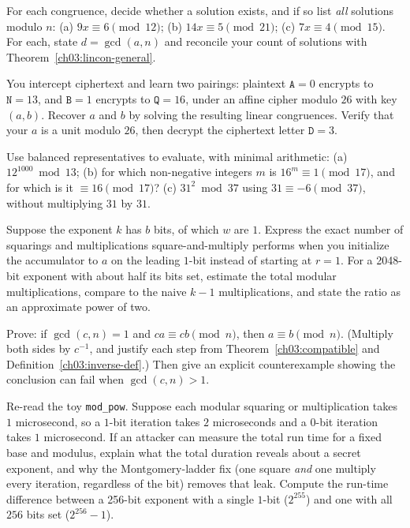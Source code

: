 \begin{exercise}
For each congruence, decide whether a solution exists, and if so list \emph{all} solutions modulo $n$:
(a) $9x \equiv 6 \pmod{12}$;\;
(b) $14x \equiv 5 \pmod{21}$;\;
(c) $7x \equiv 4 \pmod{15}$.
For each, state $d = \gcd(a,n)$ and reconcile your count of solutions with Theorem~\ref{ch03:lincon-general}.
\end{exercise}

\begin{exercise}
You intercept ciphertext and learn two pairings: plaintext $\texttt{A} = 0$ encrypts to $\texttt{N} = 13$, and $\texttt{B} = 1$ encrypts to $\texttt{Q} = 16$, under an affine cipher modulo $26$ with key $(a,b)$. Recover $a$ and $b$ by solving the resulting linear congruences. Verify that your $a$ is a unit modulo $26$, then decrypt the ciphertext letter $\texttt{D} = 3$.
\end{exercise}

\begin{exercise}
Use balanced representatives to evaluate, with minimal arithmetic:
(a) $12^{1000} \bmod 13$;\;
(b) for which non-negative integers $m$ is $16^{m} \equiv 1 \pmod{17}$, and for which is it $\equiv 16 \pmod{17}$?\;
(c) $31^2 \bmod 37$ using $31 \equiv -6 \pmod{37}$, without multiplying $31$ by $31$.
\end{exercise}

\begin{exercise}
Suppose the exponent $k$ has $b$ bits, of which $w$ are $1$. Express the exact number of squarings and multiplications square-and-multiply performs when you initialize the accumulator to $a$ on the leading $1$-bit instead of starting at $r = 1$. For a 2048-bit exponent with about half its bits set, estimate the total modular multiplications, compare to the naive $k-1$ multiplications, and state the ratio as an approximate power of two.
\end{exercise}

\begin{exercise}
Prove: if $\gcd(c,n) = 1$ and $ca \equiv cb \pmod{n}$, then $a \equiv b \pmod{n}$. (Multiply both sides by $c^{-1}$, and justify each step from Theorem~\ref{ch03:compatible} and Definition~\ref{ch03:inverse-def}.) Then give an explicit counterexample showing the conclusion can fail when $\gcd(c,n) > 1$.
\end{exercise}

\begin{exercise}
Re-read the toy \texttt{mod\_pow}. Suppose each modular squaring or multiplication takes $1$ microsecond, so a $1$-bit iteration takes $2$ microseconds and a $0$-bit iteration takes $1$ microsecond. If an attacker can measure the total run time for a fixed base and modulus, explain what the total duration reveals about a secret exponent, and why the Montgomery-ladder fix (one square \emph{and} one multiply every iteration, regardless of the bit) removes that leak. Compute the run-time difference between a 256-bit exponent with a single $1$-bit ($2^{255}$) and one with all $256$ bits set ($2^{256}-1$).
\end{exercise}
